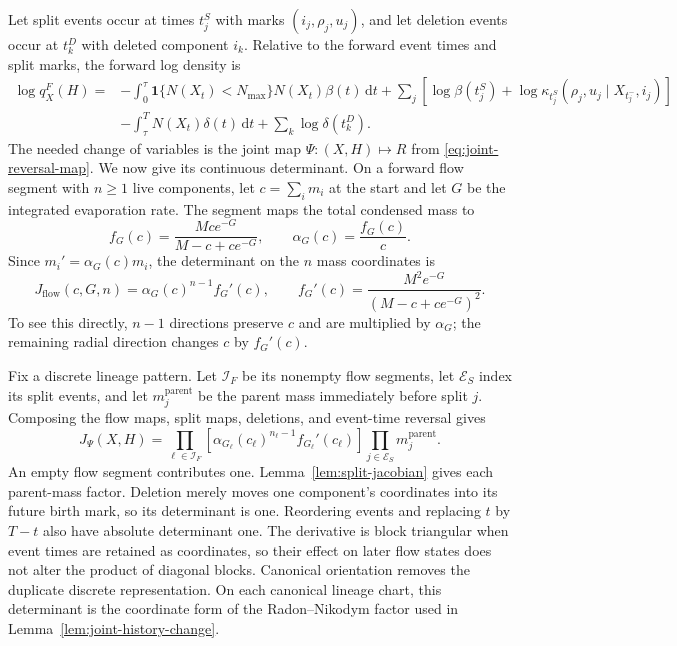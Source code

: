 \documentclass[10pt]{article}
\theoremstyle{definition}
\theoremstyle{remark}
\newcommand{\dd}{\,\mathrm{d}}
\newcommand{\ind}{\mathbf{1}}
\begin{document}
Let split events occur at times $t_j^S$ with marks
$(i_j,\rho_j,u_j)$, and let deletion events occur at $t_k^D$ with
deleted component $i_k$.  Relative to the forward event times and split
marks, the forward log density is
\begin{align}
  \log q_X^F(H)
  ={}&
  -\int_0^\tau
    \ind\{N(X_t)<N_{\max}\}N(X_t)\beta(t)\dd t
  +\sum_j
  \left[
    \log\beta(t_j^S)
    +\log\kappa_{t_j^S}(\rho_j,u_j\mid X_{t_j^-},i_j)
  \right]
  \nonumber\\
  &-\int_\tau^T N(X_t)\delta(t)\dd t
  +\sum_k\log\delta(t_k^D).
  \label{eq:forward-path-density}
\end{align}
The needed change of variables is the joint map $\Psi:(X,H)\mapsto R$ from
\eqref{eq:joint-reversal-map}.  We now give its continuous determinant.  On
a forward flow segment with $n\geq1$ live components, let
$c=\sum_i m_i$ at the start and let $G$ be the integrated evaporation rate.
The segment maps the total condensed mass to
\begin{equation}
  f_G(c)=\frac{Mce^{-G}}{M-c+ce^{-G}},
  \qquad
  \alpha_G(c)=\frac{f_G(c)}{c}.
  \label{eq:flow-radial-map}
\end{equation}
Since $m_i'=\alpha_G(c)m_i$, the determinant on the $n$ mass coordinates is
\begin{equation}
  J_{\mathrm{flow}}(c,G,n)
  =\alpha_G(c)^{n-1}f_G'(c),
  \qquad
  f_G'(c)=
  \frac{M^2e^{-G}}{(M-c+ce^{-G})^2}.
  \label{eq:flow-jacobian}
\end{equation}
To see this directly, $n-1$ directions preserve $c$ and are multiplied by
$\alpha_G$; the remaining radial direction changes $c$ by $f_G'(c)$.

Fix a discrete lineage pattern.  Let $\mathcal I_F$ be its nonempty flow
segments, let $\mathcal E_S$ index its split events, and let
$m_j^{\mathrm{parent}}$ be the parent mass immediately before split $j$.
Composing the flow maps, split maps, deletions, and event-time reversal gives
\begin{equation}
  J_\Psi(X,H)
  =\prod_{\ell\in\mathcal I_F}
    \left[
      \alpha_{G_\ell}(c_\ell)^{n_\ell-1}
      f_{G_\ell}'(c_\ell)
    \right]
    \prod_{j\in\mathcal E_S}m_j^{\mathrm{parent}}.
  \label{eq:joint-history-jacobian}
\end{equation}
An empty flow segment contributes one.  Lemma~\ref{lem:split-jacobian}
gives each parent-mass factor.  Deletion merely moves one component's
coordinates into its future birth mark, so its determinant is one.
Reordering events and replacing $t$ by $T-t$ also have absolute determinant
one.  The derivative is block triangular when event times are retained as
coordinates, so their effect on later flow states does not alter the product
of diagonal blocks.  Canonical orientation removes the duplicate discrete
representation.
On each canonical lineage chart, this determinant is the coordinate form of
the Radon--Nikodym factor used in
Lemma~\ref{lem:joint-history-change}.
\end{document}
